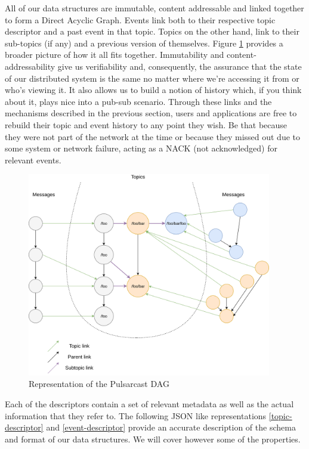 All of our data structures are immutable, content addressable and linked
together to form a Direct Acyclic Graph. Events link both to their respective
topic descriptor and a past event in that topic. Topics on the other hand, link
to their sub-topics (if any) and a previous version of themselves. Figure
\ref{fig:pulsarcast-dag} provides a broader picture of how it all fits
together. Immutability and content-addressability give us verifiability and,
consequently, the assurance that the state of our distributed system is the
same no matter where we're accessing it from or who's viewing it. It also
allows us to build a notion of history which, if you think about it, plays nice
into a pub-sub scenario. Through these links and the mechanisms described in
the previous section, users and applications are free to rebuild their topic
and event history to any point they wish. Be that because they were not part of
the network at the time or because they missed out due to some system or
network failure, acting as a NACK (not acknowledged) for relevant events.

\begin{figure}[hb!]
  \centering
  \includegraphics[width=0.95\textwidth]{img/pulsarcast-dag.png}
  \caption{Representation of the Pulsarcast DAG}
  \label{fig:pulsarcast-dag}
\end{figure}

Each of the descriptors contain a set of relevant metadata as well as the
actual information that they refer to. The following JSON like representations
\ref{topic-descriptor} and \ref{event-descriptor} provide an accurate
description of the schema and format of our data structures. We will cover
however some of the properties.

